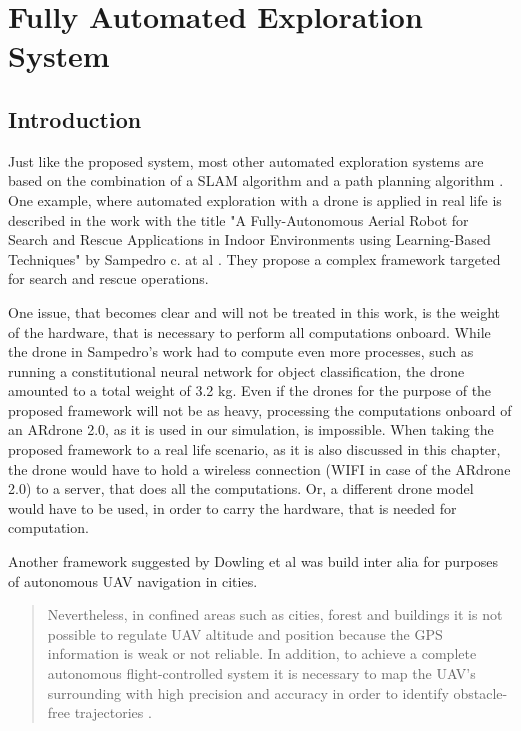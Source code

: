 \chapter{Fully Automated Exploration System}

\section{Introduction}

	Just like the proposed system, most other automated exploration systems are based on the combination of a SLAM algorithm and 
	a path planning algorithm \cite{aut1} \cite{deep} \cite{accurat} \cite{aut2}. One example, where automated exploration with a drone is 
	applied in real life is described in the work with the title "A Fully-Autonomous Aerial Robot for Search and Rescue Applications
in Indoor Environments using Learning-Based Techniques" by Sampedro c. at al \cite{aut1}. They propose a complex framework targeted for search and 
    rescue operations. 
	
	One issue, that becomes clear and will not be treated in this work, is the weight of the hardware, that is necessary to perform all computations 
	onboard. While the drone in Sampedro's work had to compute even more processes, such as running a constitutional neural network for object classification, 
	the drone amounted to a total weight of 3.2 kg. Even if the drones for the purpose of the proposed framework will not be as heavy, processing the computations onboard of an ARdrone 2.0, as 
	it is used in our simulation, is impossible. When taking the proposed framework to a real life scenario, as it is also discussed in this chapter, 
	the drone would have to hold a wireless connection (WIFI in case of the ARdrone 2.0) to a server, that does all the computations. Or, a different drone model
	would have to be used, in order 
	to carry the hardware, that is needed for computation. 
	
	Another framework suggested by Dowling et al was build inter alia for purposes of autonomous UAV navigation in cities. 
	
	\begin{quote}
	
	Nevertheless, in confined areas such as cities,
	forest and buildings it is not possible to regulate UAV altitude
	and position because the GPS information is weak or not
	reliable. In addition, to achieve a complete autonomous
	flight-controlled system it is necessary to map the UAV’s
	surrounding with high precision and accuracy in order to
	identify obstacle-free trajectories \cite{int1}.
	
	\end{quote}
	

